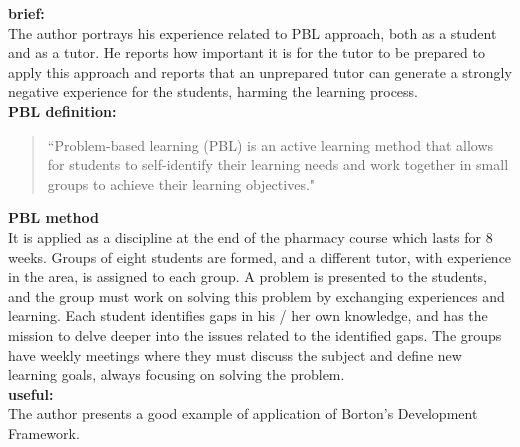 \documentclass{article}
\begin{document}
\begin{adjustwidth}{-60pt}{-30pt}
\begin{singlespace}


\begin{minipage}{1.26\textwidth}

\begin{pabox}[label={myusecounter}]{\hfill  \cite{Fernandes2021}}

\textbf{brief:} \\

The author portrays his experience related to PBL approach, both as a student and as a tutor. He reports how important it is for the tutor to be prepared to apply this approach and reports that an unprepared tutor can generate a strongly negative experience for the students, harming the learning process.\\

\textbf{PBL definition:}
\begin{quote}
 ``Problem-based learning (PBL) is an active learning method that allows for students to self-identify their learning needs and work together in small groups to achieve their learning objectives."
\end{quote} 

\textbf{PBL method} \\

It is applied as a discipline at the end of the pharmacy course which lasts for 8 weeks. Groups of eight students are formed, and a different tutor, with experience in the area, is assigned to each group. A problem is presented to the students, and the group must work on solving this problem by exchanging experiences and learning. Each student identifies gaps in his / her own knowledge, and has the mission to delve deeper into the issues related to the identified gaps. The groups have weekly meetings where they must discuss the subject and define new learning goals, always focusing on solving the problem. \\

\textbf{useful:} \\

The author presents a good example of application of Borton’s Development Framework.

\tcblower


\end{pabox}
\end{minipage}
\end{singlespace}
\end{adjustwidth}
\end{document}
